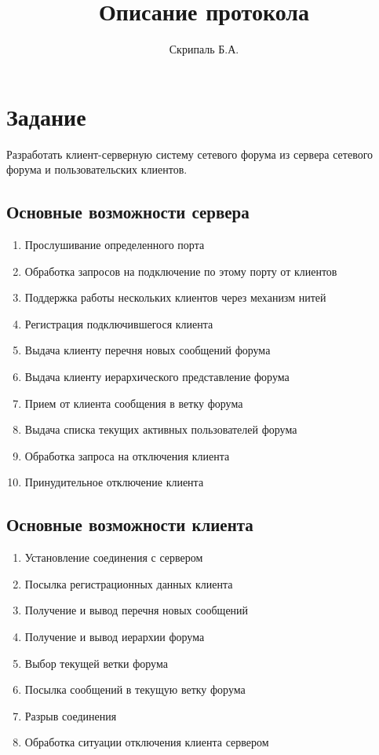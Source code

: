 \documentclass[10pt,a4paper]{report}
\begin{document}
\begin{titlepage}
\title{Описание протокола}
\author{Скрипаль Б.А.}
\end{titlepage}

\chapter{Задание}
Разработать клиент-серверную систему сетевого форума из сервера сетевого форума и пользовательских клиентов.
\section{Основные возможности сервера}
\begin{enumerate}
\item Прослушивание определенного порта
\item Обработка запросов на подключение по этому порту от клиентов
\item Поддержка работы нескольких клиентов через механизм нитей
\item Регистрация подключившегося клиента
\item Выдача клиенту перечня новых сообщений форума
\item Выдача клиенту иерархического представление форума
\item Прием от клиента сообщения в ветку форума
\item Выдача списка текущих активных пользователей форума
\item Обработка запроса на отключения клиента
\item Принудительное отключение клиента
\end{enumerate}
\section{Основные возможности клиента}
\begin{enumerate}
\item Установление соединения с сервером
\item Посылка регистрационных данных клиента
\item Получение и вывод перечня новых сообщений 
\item Получение и вывод иерархии форума
\item Выбор текущей ветки форума
\item Посылка сообщений в текущую ветку форума
\item Разрыв соединения
\item Обработка ситуации отключения клиента сервером
\end{enumerate}
\end{document}
